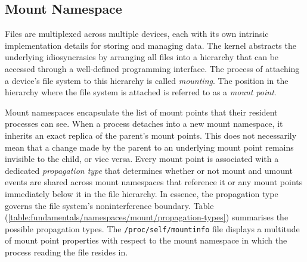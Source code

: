 

\subsection{Mount Namespace}
\label{sections:fundamentals/namespaces/mount}
Files are multiplexed across multiple devices, each with its own intrinsic implementation details 
for storing and managing data. The kernel abstracts the underlying idiosyncrasies 
by arranging all files into a hierarchy that can be accessed through a well-defined programming interface. 
The process of attaching a device's file system 
to this hierarchy is called \textit{mounting}. The position in the hierarchy where the file system 
is attached is referred to as a \textit{mount point}.

Mount namespaces encapsulate the list of mount points that their resident processes can 
see. When a process detaches into a new mount namespace, it inherits an exact replica of the parent's mount points.
This does not necessarily mean that a change made by the parent to an underlying mount point remains 
invisible to the child, or vice versa. Every mount point is associated with a dedicated \textit{propagation type} 
that determines whether or not mount and umount events are shared across mount namespaces 
that reference it or any mount points immediately below it in the file hierarchy.  
In essence, the propagation type governs the file system's noninterference boundary. 
Table (\ref{table:fundamentals/namespaces/mount/propagation-types}) summarises the possible 
propagation types. The \verb|/proc/self/mountinfo| file 
displays a multitude of mount point properties with respect to the mount namespace in which 
the process reading the file resides in. 

